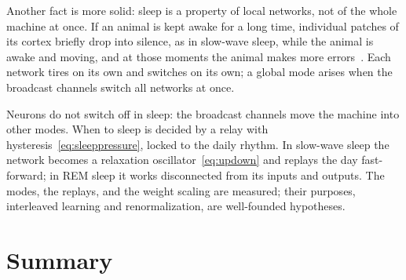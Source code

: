 Another fact is more solid: sleep is a property of local networks, not of the whole machine at once. If an animal is kept awake for a long time, individual patches of its cortex briefly drop into silence, as in slow-wave sleep, while the animal is awake and moving, and at those moments the animal makes more errors~\cite{Vyazovskiy2011}. Each network tires on its own and switches on its own; a global mode arises when the broadcast channels switch all networks at once.

\begin{keyblock}
\begin{proposition}
\label{prop:sleep}
Neurons do not switch off in sleep: the broadcast channels move the machine into other modes. When to sleep is decided by a relay with hysteresis~\eqref{eq:sleeppressure}, locked to the daily rhythm. In slow-wave sleep the network becomes a relaxation oscillator~\eqref{eq:updown} and replays the day fast-forward; in REM sleep it works disconnected from its inputs and outputs. The modes, the replays, and the weight scaling are measured; their purposes, interleaved learning and renormalization, are well-founded hypotheses.
\end{proposition}
\end{keyblock}

\section{Summary}

